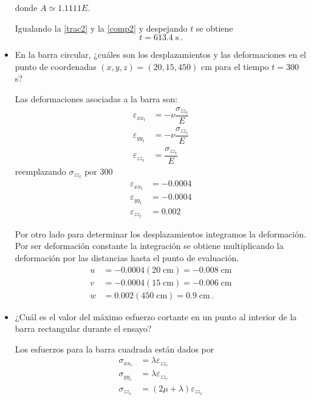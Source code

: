 \documentclass[../notas medios.tex]{subfiles}
\begin{document}
\begin{itemize}
donde $A \simeq 1.1111E$.

Igualando la \cref {trac2} y la  \cref{comp2} y despejando $t$ se obtiene
\[t=613.4 \; \text{s}\, .\]

\item En la barra circular, ¿cuáles son los desplazamientos y las deformaciones en el punto de coordenadas $(x,y,z) = (20,15,450)$ cm para el tiempo $t = 300$ s?

Las deformaciones asociadas a la barra son:
\begin{equation}
  \begin{split}
  \varepsilon_{xx_t} &= -\nu \dfrac{\sigma_{zz_t} }{E} \\
  \varepsilon_{yy_t} &= -\nu \dfrac{\sigma_{zz_t} }{E} \\
  \varepsilon_{zz_t} &= \dfrac{\sigma_{zz_t} }{E}
  \end{split}
  \label{defpto2}
\end{equation}
reemplazando $\sigma_{zz_t}$ por 300
\begin{equation}
  \begin{split}
  \varepsilon_{xx_t} &= -0.0004 \\
  \varepsilon_{yy_t} &= -0.0004 \\
  \varepsilon_{zz_t} &= 0.002
  \end{split}
  \label{defpto2sol}
\end{equation}

Por otro lado para determinar los desplazamientos integramos la deformación. Por ser deformación constante la integración se obtiene multiplicando la deformación por las distancias hasta el punto de evaluación.
\begin{equation}
  \begin{split}
  u &= -0.0004 (20  \;\text{cm}) = -0.008 \;\text{cm} \\
  v &= -0.0004 (15  \;\text{cm}) = -0.006 \;\text{cm}  \\
  w &= 0.002  (450  \;\text{cm}) = 0.9  \; \text{cm}\, .
  \end{split}
\label{defpto2sol}
\end{equation}

\item  ¿Cuál es el valor del máximo esfuerzo cortante en un punto al interior de la barra rectangular durante el ensayo?

Los esfuerzos para la barra cuadrada están dados por
\begin{equation}
  \begin{split}
  \sigma_{xx_c} &=   \lambda \varepsilon_{zz_c} \\
  \sigma_{yy_c} &=   \lambda \varepsilon_{zz_c} \\
  \sigma_{zz_c} &=  (2\mu + \lambda) \varepsilon_{zz_c}
  \end{split}
  \label{defpto2}
\end{equation}


\end{itemize}
\end{document}
